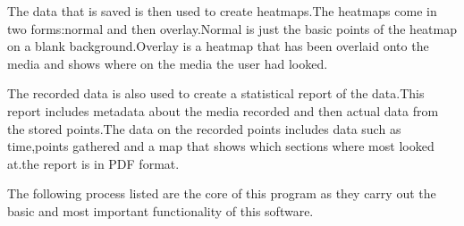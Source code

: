 The data that is saved is then used to create heatmaps.The heatmaps come in two forms:normal and then overlay.Normal is just the basic points of the heatmap on a blank background.Overlay is a heatmap that has been overlaid onto the media and shows where on the media the user had looked.

The recorded data is also used to create a statistical report of the data.This report includes metadata about the media recorded and then actual data from the stored points.The data on the recorded points includes  data such as time,points gathered and a map that shows which sections where most looked at.the report is in PDF format.

The following process listed are the core of this program as they carry out the basic and most important functionality of this software.
